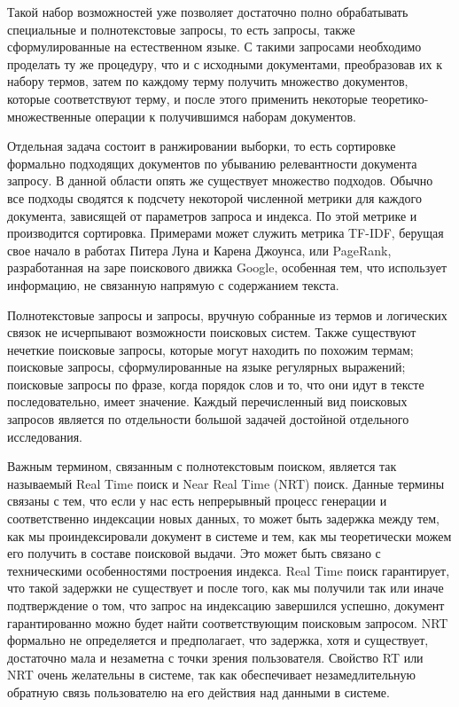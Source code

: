 Такой набор возможностей уже позволяет достаточно полно обрабатывать специальные и полнотекстовые запросы, то есть запросы, также сформулированные на естественном языке. С такими запросами необходимо проделать ту же процедуру, что и с исходными документами, преобразовав их к набору термов, затем по каждому терму получить множество документов, которые соответствуют терму, и после этого применить некоторые теоретико-множественные операции к получившимся наборам документов.

Отдельная задача состоит в ранжировании выборки, то есть сортировке формально подходящих документов по убыванию релевантности документа запросу. В данной области опять же существует множество подходов. Обычно все подходы сводятся к подсчету некоторой численной метрики для каждого документа, зависящей от параметров запроса и индекса. По этой метрике и производится сортировка. Примерами может служить метрика TF-IDF, берущая свое начало в работах Питера Луна\cite{luhn} и Карена Джоунса\cite{jones}, или PageRank\cite{google}, разработанная на заре поискового движка Google, особенная тем, что использует информацию, не связанную напрямую с содержанием текста.

Полнотекстовые запросы и запросы, вручную собранные из термов и логических связок не исчерпывают возможности поисковых систем. Также существуют нечеткие поисковые запросы, которые могут находить по похожим термам; поисковые запросы, сформулированные на языке регулярных выражений; поисковые запросы по фразе, когда порядок слов и то, что они идут в тексте последовательно, имеет значение. Каждый перечисленный вид поисковых запросов является по отдельности большой задачей достойной отдельного исследования.

Важным термином, связанным с полнотекстовым поиском, является так называемый Real Time поиск и Near Real Time (NRT) поиск. Данные термины связаны с тем, что если у нас есть непрерывный процесс генерации и соответственно индексации новых данных, то может быть задержка между тем, как мы проиндексировали документ в системе и тем, как мы теоретически можем его получить в составе поисковой выдачи. Это может быть связано с техническими особенностями построения индекса. Real Time поиск гарантирует, что такой задержки не существует и после того, как мы получили так или иначе подтверждение о том, что запрос на индексацию завершился успешно, документ гарантированно можно будет найти соответствующим поисковым запросом. NRT формально не определяется и предполагает, что задержка, хотя и существует, достаточно мала и незаметна с точки зрения пользователя. Свойство RT или NRT очень желательны в системе, так как обеспечивает незамедлительную обратную связь пользователю на его действия над данными в системе.

